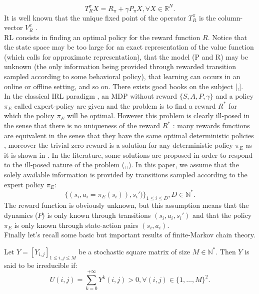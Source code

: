 \documentclass{llncs}
\newcommand{\0}{\mathbf{0}}
\newcommand{\1}{\mathbf{1}}
\begin{document}
\begin{equation}
T^\pi_RX=R_\pi+\gamma P_\pi X , \forall X\in \mathbb{R}^N.
\end{equation}
It is well known that the unique fixed point of the operator $T^\pi_R$ is the column-vector $V^\pi_R$ \cite{puterman1994markov}.\\
RL consists in finding an optimal policy for the reward function $R$. Notice that the state space may be too large for an exact representation of the value function (which calls for approximate
representation), that the model (P and R) may be unknown (the only information being provided through rewarded transition sampled according
to some behavioral policy), that learning can occurs in an online or offline setting, and so on. There exists good books on the subject [\cite{bertsekas2001dynamic},\cite{sutton1998reinforcement}].\\
In the classical IRL paradigm \cite{ng2000algorithms}, an MDP without reward $\{S,A,P,\gamma\}$ and a policy $\pi_E$ called expert-policy are given and the problem is to find
a reward $R^*$ for which the policy $\pi_E$ will be optimal. However this problem is clearly ill-posed in the sense that there is no uniqueness of the reward $R^*$ : many rewards functions are equivalent in the sense that they have the same optimal deterministic policies \cite{ng1999policyreward}, moreover the trivial zero-reward is a solution for any deterministic policy $\pi_E$ as it is shown in \cite{ng2000algorithms}. In the literature, some solutions are proposed in order to respond to the ill-posed nature of the problem (\cite{ng2000algorithms},\cite{ziebart2008maximum},\cite{boularias2011relative}).
In this paper, we assume that the solely available information is provided by transitions sampled according to the expert policy $\pi_E$:
\begin{equation}
\label{equation:data}
\{(s_i,a_i=\pi_E(s_i)),s_i')\}_{1\leq i \leq D}, D\in\mathbb{N}^*.
\end{equation}
The reward function is obviously unknown, but this assumption means that the dynamics ($P$) is only known through transitions $(s_i, a_i, s_i')$ and that the
policy $\pi_E$ is only known through state-action pairs $(s_i, a_i)$.\\
Finally let's recall some basic but important results of finite-Markov chain theory.
\begin{definition}
Let $Y=[Y_{i,j}]_{1\leq i,j \leq M}$ be a  stochastic square matrix of size $M\in\mathbb{N}^*$. Then $Y$ is said to be irreducible if:
\begin{equation}
U(i,j)=\sum_{k=0}^{+\infty}Y^k(i,j)>0 ,\forall (i,j)\in \{1,\dots,M\}^2.
\end{equation}
\end{definition}
\end{document}
